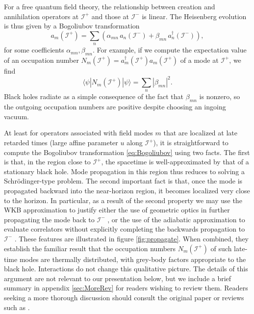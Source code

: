 \documentclass[letterpaper,12pt]{article}
\newcommand*{\scri}{\mathscr{I}} %
\begin{document}
For a free quantum field theory, the relationship between creation and annihilation operators at $\scri^+$ and those at $\scri^-$ is linear. The Heisenberg evolution is thus given by a Bogoliubov transformation
\begin{equation}\label{eq:Bogoliubov}
	a_m(\scri^+) = \sum_{n} \left(\alpha_{mn} \, a_n(\scri^-) + \beta_{mn} \, a_n^\dagger(\scri^-)\right) ,
\end{equation}
for some coefficients $\alpha_{mn},\beta_{mn}$. For example, if we compute the expectation value of an occupation number $N_m(\scri^+) = a_m^\dagger(\scri^+)a_m(\scri^+)$ of a mode at $\scri^+$, we find
\begin{equation}
	\langle\psi|N_m(\scri^+)|\psi\rangle = \sum_n |\beta_{mn}|^2.
\end{equation}
Black holes radiate as a simple consequence of the fact that $\beta_{mn}$ is nonzero, so the outgoing occupation numbers are positive despite choosing an ingoing vacuum.

At least for operators associated with field modes $m$ that are localized at late retarded times (large affine parameter $u$ along $\scri^+$), it is straightforward to compute the Bogoliubov transformation \eqref{eq:Bogoliubov} using two facts.  The first is that, in the region close to $\scri^+$, the spacetime is well-approximated by that of a stationary black hole.  Mode propagation in this region thus reduces to solving a Schr\"odinger-type problem.  The second important fact is that, once the mode is propagated backward into the near-horizon region, it becomes localized very close to the horizon.  In particular, as a result of the second property we may use the WKB approximation to justify either the use of geometric optics in further propagating the mode back to $\scri^-$ \cite{Hawking:1974sw}, or the use of the adiabatic approximation to evaluate correlators without explicitly completing the backwards propagation to $\scri^-$ \cite{Unruh:1977ga,Fredenhagen:1989kr,Jacobson:1993hn,Jacobson:2003vx}.  These features are illustrated in figure \ref{fig:propagate}.  When combined, they establish the familiar result that the occupation numbers $N_m(\scri^+)$ of such late-time modes are thermally distributed, with grey-body factors appropriate to the black hole. Interactions do not change this qualitative picture. The details of this argument are not relevant to our presentation below, but we include a brief summary in appendix \ref{sec:MoreRev} for readers wishing to review them.  Readers seeking a more thorough discussion should consult the original paper  \cite{Hawking:1974sw} or reviews such as \cite{Jacobson:2003vx,Harlow:2014yka}.
\end{document}

